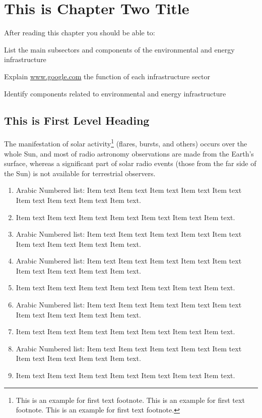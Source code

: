 
\chapter{This is Chapter Two Title}

After reading this chapter you should be able to:

\begin{objectives}
\item List the main subsectors and components of the environmental and energy infrastructure

\item Explain \url{www.google.com} the function of each infrastructure sector

\item Identify components related to environmental and energy infrastructure
\end{objectives}

\section{This is First Level Heading}

\lipsum[1-2]

The manifestation of solar activity\footnote{This is an example for first text footnote. This is an example for first text footnote. This is an example for first text footnote.} (flares, bursts, and others) occurs over the whole Sun, and most of radio astronomy observations are made from the Earth's surface, whereas a significant part of solar radio events (those from the far side of the Sun) is not available for terrestrial observers.
\begin{enumerate}[1.]
\item Arabic Numbered list: Item text  Item text  Item text  Item text  Item text
Item text Item text Item text  Item text.
\item Item text  Item text  Item text  Item text  Item text  Item text  Item text.
\item Arabic Numbered list: Item text  Item text  Item text  Item text  Item text
Item text Item text Item text  Item text.
\item Arabic Numbered list: Item text  Item text  Item text  Item text  Item text
Item text Item text Item text  Item text.
\item Item text  Item text  Item text  Item text  Item text  Item text  Item text.
\item Arabic Numbered list: Item text  Item text  Item text  Item text  Item text
Item text Item text Item text  Item text.
\item Item text  Item text  Item text  Item text  Item text  Item text  Item text.
\item Arabic Numbered list: Item text  Item text  Item text  Item text  Item text
Item text Item text Item text  Item text.
\item Item text  Item text  Item text  Item text  Item text  Item text  Item text.
\end{enumerate}

